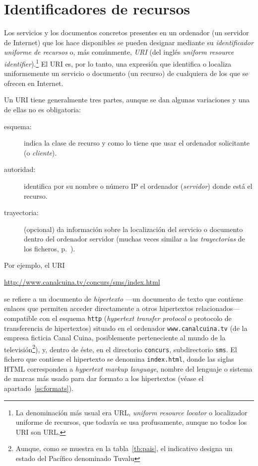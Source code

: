 \section{Identificadores de recursos} Los servicios y los documentos concretos presentes en un ordenador (un servidor de Internet) que los hace disponibles se pueden designar mediante su \emph{identificador uniforme de recursos} o, más comúnmente, \emph{URI} (del inglés \emph{uniform resource identifier}).\footnote{La denominación más usual era URL, \emph{uniform resource locator} o localizador uniforme de recursos, que todavía se usa profusamente, aunque no todos los URI son URL.} El URI es, por lo tanto, una expresión que identifica o localiza uniformemente un servicio o documento (un recurso) de cualquiera de los que se ofrecen en Internet. 

Un URI tiene generalmente tres partes, aunque se dan algunas variaciones y una de ellas no es obligatoria: \begin{description} \item[esquema:] indica la clase de recurso y como lo tiene que usar el ordenador solicitante (o \emph{cliente}). \item[autoridad:] identifica por su nombre o número IP el ordenador (\emph{servidor}) donde está el recurso. \item[trayectoria:] (opcional) da información sobre la localización del servicio o documento dentro del ordenador servidor (muchas veces similar a las \emph{trayectorias} de los ficheros, p.~\pageref{pg:fitxer}). \end{description} Por ejemplo, el URI \begin{center} \url{http://www.canalcuina.tv/concurs/sms/index.html} \end{center} se refiere a un documento de \emph{hipertexto} ---un documento de texto que contiene enlaces que permiten acceder directamente a otros hipertextos relacionados--- compatible con el esquema \texttt{http} (\emph{hypertext transfer protocol} o protocolo de transferencia de hipertextos) situado en el ordenador \texttt{www.canalcuina.tv} (de la empresa ficticia Canal Cuina, posiblemente perteneciente al mundo de la televisión\footnote{Aunque, como se muestra en la tabla~\ref{tb:pais}, el indicativo designa un estado del Pacífico denominado Tuvalu}), y, dentro de éste, en el directorio \texttt{concurs}, subdirectorio \texttt{sms}. El fichero que contiene el hipertexto se denomina \texttt{index.html}, donde las siglas HTML corresponden a \emph{hypertext markup language}, nombre del lenguaje o sistema de marcas más usado para dar formato a los hipertextos (véase el apartado~\ref{ss:formats}). 

